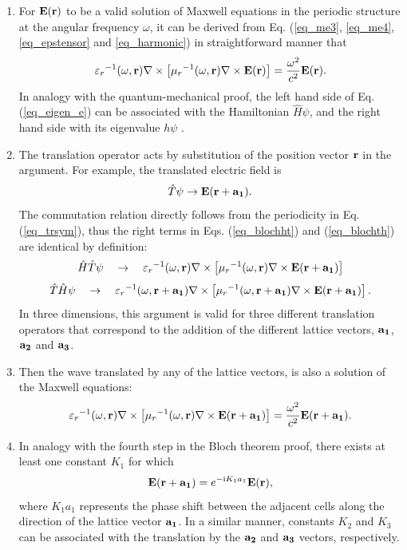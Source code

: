\begin{enumerate}
\item{
For $\mathbf{E}({\mathbf{r}})$ to be a  valid solution of Maxwell equations in the periodic structure at the angular frequency $\omega$,
it can be derived from Eq. (\ref{eq_me3}, \ref{eq_me4}, \ref{eq_epstensor} and \ref{eq_harmonic}) in straightforward manner that
\begin{equation} 
{\varepsilon_r}^{-1}(\omega,{\mathbf{r}}) \nabla\times \left[{\mu_r}^{-1 }(\omega,{\mathbf{r}}) \nabla\times \mathbf{E}({\mathbf{r}}) \right] = \frac{\omega^2}{c^2}\mathbf{E}({\mathbf{r}}).   \label{eq_eigen_e}
\end{equation}
In analogy with the quantum-mechanical proof, the left hand side of Eq. (\ref{eq_eigen_e}) can be associated with the Hamiltonian $\hat H\psi$, and the right hand side with its eigenvalue $h\psi$ \cite{johnson2003introduction}. 
} 
\item{
The translation operator acts by substitution of the position vector ${\mathbf{r}}$ in the argument. For example, the translated electric field is
\begin{equation} \hat T\psi \rightarrow \mathbf{E}({\mathbf{r}}+\mathbf{a_1}). \label{eq_blocht}\end{equation}
The commutation relation directly follows from the periodicity in Eq. (\ref{eq_trsym}), thus the right terms in Eqs. (\ref{eq_blochht}) and (\ref{eq_blochth}) are identical by definition:
\begin{equation} \hat H \hat T \psi \quad  \rightarrow \quad  {\varepsilon_r}^{-1}(\omega,{\mathbf{r}}    ) \nabla\times \left[{\mu_r}^{-1 }(\omega,{\mathbf{r}}    ) \nabla\times \mathbf{E}({\mathbf{r}}+{\mathbf{a_1}})\right]  \label{eq_blochht}\end{equation}
\begin{equation} \hat T \hat H \psi \quad  \rightarrow \quad  {\varepsilon_r}^{-1}(\omega,{\mathbf{r}}+{\mathbf{a_1}}) \nabla\times \left[{\mu_r}^{-1 }(\omega,{\mathbf{r}}+{\mathbf{a_1}}) \nabla\times \mathbf{E}({\mathbf{r}}+{\mathbf{a_1}})\right] .  \label{eq_blochth}\end{equation}
In three dimensions, this argument is valid for three different translation operators that correspond to the addition of the different lattice vectors, ${\mathbf{a_1}}$, ${\mathbf{a_2}}$ and ${\mathbf{a_3}}$.
} 
\item{
Then the wave translated by any of the lattice vectors, is also a solution of the Maxwell equations:
\begin{equation}  {\varepsilon_r}^{-1}(\omega,{\mathbf{r}}) \nabla\times \left[{\mu_r}^{-1 }(\omega,{\mathbf{r}}) \nabla\times   \mathbf{E}({\mathbf{r}}+{\mathbf{a_1}})\right] =  \frac{\omega^2}{c^2}\mathbf{E}({\mathbf{r}}+{\mathbf{a_1}}).  \label{eq_blochme}\end{equation}
}
\item{In analogy with the fourth step in the Bloch theorem proof, there exists at least one constant $K_1$ for which
\begin{equation}  \mathbf{E}({\mathbf{r}}+{\mathbf{a_1}}) = e^{-{\mathrm i} K_1 a_1} \mathbf{E}({\mathbf{r}}),  \label{eq_blochtt}\end{equation}
	where $K_1 a_1$ represents the phase shift between the adjacent cells along the direction of the lattice vector ${\mathbf{a_1}}$. In a similar manner, constants $K_2$ and $K_3$ can be associated with the translation by the ${\mathbf{a_2}}$ and ${\mathbf{a_3}}$ vectors, respectively. 
}
 \end{enumerate}

